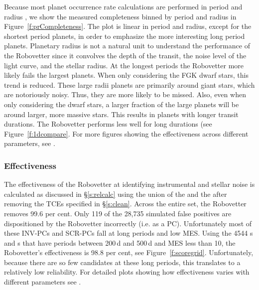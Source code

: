 Because most planet occurrence rate calculations are performed in period and radius \citep[e.g.][]{Burke2015}, we show the measured completeness binned by period and radius in Figure~\ref{f:prCompleteness}. The plot is linear in period and radius, except for the shortest period planets, in order to emphasize the more interesting long period planets. Planetary radius is not a natural unit to understand the performance of the Robovetter since it convolves the depth of the transit, the noise level of the light curve, and the stellar radius.  At the longest periods the Robovetter more likely fails the largest planets.  When only considering the FGK dwarf stars, this trend is reduced.  These large radii planets are primarily around giant stars, which are notoriously noisy. Thus, they are more likely to be missed. Also, even when only considering the dwarf stars, a larger fraction of the large planets will be around larger, more massive stars. This results in planets with longer transit durations. The Robovetter performs less well for long durations (see Figure~\ref{f:1dcompare}. For more figures showing the effectiveness across different parameters, see \citet{Coughlin2017detmetrics}.


\subsubsection{Effectiveness}
The effectiveness of the Robovetter at identifying instrumental and stellar noise is calculated as discussed in \S\ref{s:relcalc} using the union of the  and the  after removing the TCEs specified in \S\ref{s:clean}. Across the entire set, the Robovetter removes 99.6 per cent.  Only 119 of the 28,735 simulated false positives are dispositioned by the Robovetter incorrectly (i.e. as a PC).  Unfortunately most of these INV-PCs and SCR-PCs fall at long periods and low MES.
Using the 4544 \invtce s and \scrtce s that have periods between 200\,d and 500\,d and MES less than 10, the Robovetter's effectiveness is 98.8 per cent, see Figure~\ref{f:scoregrid}.  Unfortunately, because there are so few candidates at these long periods, this translates to a relatively low reliability.  For detailed plots showing how effectiveness varies with different parameters see \citet{Coughlin2017detmetrics}.


